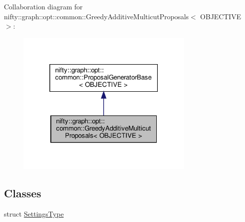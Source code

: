 Collaboration diagram for nifty\+:\+:graph\+:\+:opt\+:\+:common\+:\+:Greedy\+Additive\+Multicut\+Proposals$<$ O\+B\+J\+E\+C\+T\+I\+VE $>$\+:
\nopagebreak
\begin{figure}[H]
\begin{center}
\leavevmode
\includegraphics[width=244pt]{classnifty_1_1graph_1_1opt_1_1common_1_1GreedyAdditiveMulticutProposals__coll__graph}
\end{center}
\end{figure}
\subsection*{Classes}
\begin{DoxyCompactItemize}
\item 
struct \hyperlink{structnifty_1_1graph_1_1opt_1_1common_1_1GreedyAdditiveMulticutProposals_1_1SettingsType}{Settings\+Type}
\end{DoxyCompactItemize}
